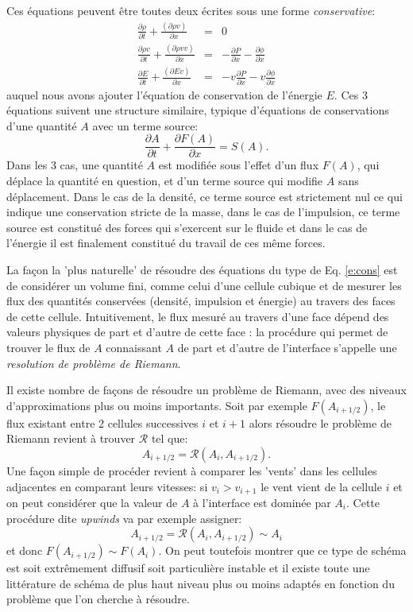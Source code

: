 Ces équations peuvent être toutes deux écrites sous une forme \textit{conservative}:
\begin{eqnarray}
\frac{\partial \rho}{\partial t}+\frac{(\partial \rho v)}{\partial x}&=&0\\
\frac{\partial \rho v}{\partial t}+\frac{(\partial \rho v v)}{\partial x}&=&-\frac{\partial P}{\partial x}-\frac{\partial \phi}{\partial x}\\
\frac{\partial E}{\partial t}+\frac{(\partial E v)}{\partial x}&=&-v \frac{\partial P}{\partial x}-v\frac{\partial \phi}{\partial x}
\end{eqnarray}
auquel nous avons ajouter l'équation de conservation de l'énergie $E$. Ces 3 équations suivent une structure similaire, typique d'équations de conservations d'une quantité $A$ avec un terme source:
\begin{equation}
\frac{\partial A}{\partial t}+\frac{\partial F(A)}{\partial x}=S(A).
\label{e:cons}
\end{equation}
Dans les 3 cas, une quantité $A$ est modifiée sous l'effet d'un flux $F(A)$, qui déplace la quantité en question, et d'un terme source qui modifie $A$ sans déplacement. Dans le cas de la densité, ce terme source est strictement nul ce qui indique une conservation stricte de la masse, dans le cas de l'impulsion, ce terme source est constitué des forces qui s'exercent sur le fluide et dans le cas de l'énergie il est finalement constitué du travail de ces même forces.

La façon la 'plus naturelle' de résoudre des équations du type de Eq. \ref{e:cons} est de considérer un volume fini, comme celui d'une cellule cubique et de mesurer les flux des quantités conservées (densité, impulsion et énergie) au travers des faces de cette cellule. Intuitivement, le flux mesuré au travers d'une face dépend des valeurs physiques de part et d'autre de cette face : la procédure qui permet de trouver le flux de $A$ connaissant $A$ de part et d'autre de l'interface s'appelle une \textit{resolution de problème de Riemann}.

 Il existe nombre de façons de résoudre un problème de Riemann, avec des niveaux d'approximations plus ou moins importants. Soit par exemple $F(A_{i+1/2})$, le flux existant entre 2 cellules successives $i$ et $i+1$ alors résoudre le problème de Riemann revient à trouver $\mathcal R$ tel que:
 \begin{equation}
 A_{i+1/2}=\mathcal{R}(A_i, A_{i+1/2}).
 \end{equation}
 Une façon simple de procéder revient à comparer les 'vents' dans les cellules adjacentes en comparant leurs vitesses: si $v_i>v_{i+1}$ le vent vient de la cellule $i$ et on peut considérer que la valeur de $A$ à l'interface est dominée par $A_i$. Cette procédure dite \textit{upwinds} va par exemple assigner:
  \begin{equation}
 A_{i+1/2}=\mathcal{R}(A_i, A_{i+1/2})\sim A_i
 \end{equation}
 et donc $F(A_{i+1/2})\sim F(A_{i})$. On peut toutefois montrer que ce type de schéma est soit extrêmement diffusif soit particulière instable et il existe toute une littérature de schéma de plus haut niveau plus ou moins adaptés en fonction du problème que l'on cherche à résoudre.
 
